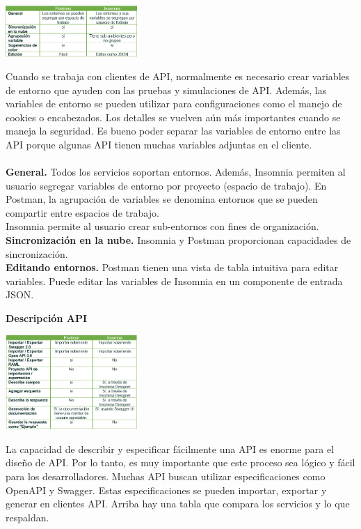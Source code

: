 \documentclass[twoside,twocolumn]{article}
\begin{document}
\begin{center}
	\includegraphics[width=5cm]{./img/21.png} 
\end{center}
Cuando se trabaja con clientes de API, normalmente es necesario crear variables de entorno que ayuden con las pruebas y simulaciones de API. Además, las variables de entorno se pueden utilizar para configuraciones como el manejo de cookies o encabezados. Los detalles se vuelven aún más importantes cuando se maneja la seguridad. Es bueno poder separar las variables de entorno entre las API porque algunas API tienen muchas variables adjuntas en el cliente.\\
\\\textbf{General. } Todos los servicios soportan entornos. Además, Insomnia  permiten al usuario segregar variables de entorno por proyecto (espacio de trabajo). En Postman, la agrupación de variables se denomina entornos que se pueden compartir entre espacios de trabajo.
\\Insomnia permite al usuario crear sub-entornos con fines de organización.
\\\textbf{Sincronización en la nube. }  Insomnia y Postman proporcionan capacidades de sincronización.
\\\textbf{Editando entornos.  }  Postman tienen una vista de tabla intuitiva para editar variables. Puede editar las variables de Insomnia en un componente de entrada JSON.

\textbf{Descripción API}\\

\begin{center}
	\includegraphics[width=5cm]{./img/22.png} 
\end{center}

La capacidad de describir y especificar fácilmente una API es enorme para el diseño de API. Por lo tanto, es muy importante que este proceso sea lógico y fácil para los desarrolladores. Muchas API buscan utilizar especificaciones como OpenAPI y Swagger. Estas especificaciones se pueden importar, exportar y generar en clientes API. Arriba hay una tabla que compara los servicios y lo que respaldan.
\end{document}

